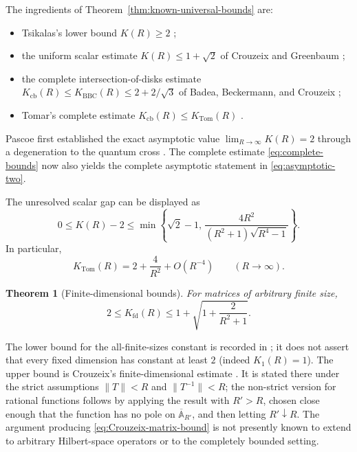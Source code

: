 \documentclass[11pt]{article}
\newtheorem{theorem}{Theorem}[section]
\theoremstyle{definition}
\theoremstyle{remark}
\newcommand{\cb}{\mathrm{cb}}
\newcommand{\fd}{\mathrm{fd}}
\begin{document}
\noindent
The ingredients of Theorem~\ref{thm:known-universal-bounds} are:
\begin{itemize}
 \item Tsikalas's lower bound \(K(R)\geq2\)
 \cite{Tsikalas2022};
 \item the uniform scalar estimate \(K(R)\leq1+\sqrt2\) of
 Crouzeix and Greenbaum \cite{CrouzeixGreenbaum2019};
 \item the complete intersection-of-disks estimate
 \(K_{\cb}(R)\leq K_{\mathrm{BBC}}(R)\leq2+2/\sqrt3\) of
 Badea, Beckermann, and Crouzeix \cite{BadeaBeckermannCrouzeix2009};
 \item Tomar's complete estimate
 \(K_{\cb}(R)\leq K_{\mathrm{Tom}}(R)\)
 \cite{Tomar2026}.
\end{itemize}
Pascoe first established the exact asymptotic value
\(\lim_{R\to\infty}K(R)=2\) through a degeneration to the quantum
cross \cite{Pascoe2025}.  The complete estimate
\eqref{eq:complete-bounds} now also yields the complete asymptotic
statement in \eqref{eq:asymptotic-two}.

The unresolved scalar gap can be displayed as
\begin{equation}
 0\leq K(R)-2
 \leq
 \min\left\{
  \sqrt2-1,\,
  \frac{4R^2}{(R^2+1)\sqrt{R^4-1}}
 \right\}.
 \label{eq:unresolved-gap}
\end{equation}
In particular,
\[
 K_{\mathrm{Tom}}(R)
 =
 2+\frac{4}{R^2}+O(R^{-4})
 \qquad(R\to\infty).
\]

\begin{theorem}[Finite-dimensional bounds]
\label{thm:finite-dimensional-bound}
For matrices of arbitrary finite size,
\begin{equation}
 2\leq K_{\fd}(R)
 \leq
 1+\sqrt{1+\frac{2}{R^2+1}}.
 \label{eq:Crouzeix-matrix-bound}
\end{equation}
\end{theorem}

The lower bound for the all-finite-sizes constant is recorded in
\cite{Tsikalas2026}; it does not assert that every fixed dimension has
constant at least \(2\) (indeed \(K_1(R)=1\)).  The upper bound is
Crouzeix's finite-dimensional estimate \cite{Crouzeix2025}.  It is
stated there under the strict assumptions
\(\|T\|<R\) and \(\|T^{-1}\|<R\); the non-strict version for rational
functions follows by applying the result with \(R'>R\), chosen close
enough that the function has no pole on
\(\overline{\mathbb A}_{R'}\), and then letting \(R'\downarrow R\).
The argument producing \eqref{eq:Crouzeix-matrix-bound} is not
presently known to extend to arbitrary Hilbert-space operators or to
the completely bounded setting.
\end{document}
